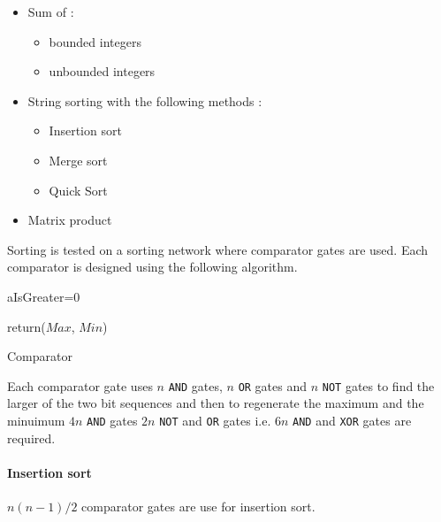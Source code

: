\documentclass{acm_proc_article-sp}
\begin{document}
\begin{itemize}
\item Sum of : 
	\begin{itemize}
	\item  bounded integers
	\item unbounded integers
 	\end{itemize}
\item String sorting with the following methods :
	\begin{itemize}
	\item Insertion sort
	\item Merge sort
	\item Quick Sort
	\end{itemize}
\item Matrix product
\end{itemize}


Sorting is tested on a sorting network where comparator gates are used. Each comparator is designed using the following algorithm. 

\linesnumbered
\begin{algorithm}[H]
 \SetVline
 aIsGreater=$0$\;



return($Max$, $Min$)
 \caption{Comparator\label{Code:algo}}
\end{algorithm}

Each comparator gate uses $n$ \texttt{AND} gates, $n$ \texttt{OR} gates and $n$ \texttt{NOT} gates to find the larger of the two bit sequences and then to regenerate the maximum and the minuimum $4n$ \texttt{AND} gates $2n$ \texttt{NOT} and \texttt{OR} gates i.e. $6n$ \texttt{AND} and \texttt{XOR} gates are required.  

\paragraph{Insertion sort} $n(n-1)/2$ comparator gates are use for insertion sort.
\end{document}
